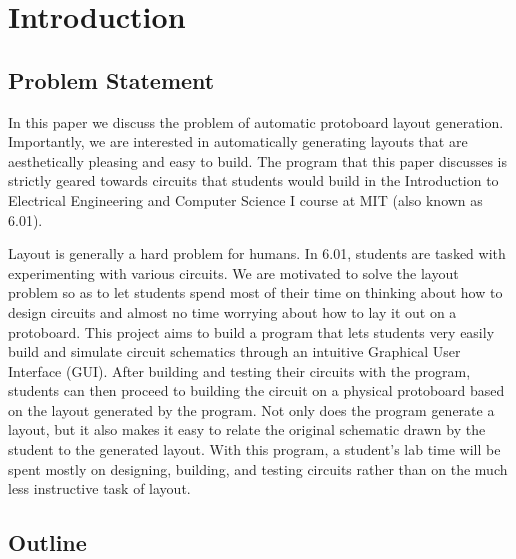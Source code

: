 

\chapter{Introduction}
\label{ch:intro}

\section{Problem Statement}

In this paper we discuss the problem of automatic protoboard layout generation.
Importantly, we are interested in automatically generating layouts that are
aesthetically pleasing and easy to build. The program that this paper discusses
is strictly geared towards circuits that students would build in the
Introduction to Electrical Engineering and Computer Science I course at MIT (also known as 6.01).

Layout is generally a hard problem for humans. In 6.01, students are tasked with
experimenting with various circuits. We are motivated to solve the layout
problem so as to let students spend most of their time on thinking about how to
design
circuits and almost no time worrying about how to lay it out on a protoboard.
This project aims to build a program that lets students very easily build and
simulate circuit schematics through an intuitive Graphical User Interface (GUI).
After building and testing their circuits with the program, students can then
proceed to building the circuit on a physical protoboard based on the layout
generated by the program. Not only does the program generate a layout, but it
also makes it easy to relate the original schematic drawn by the student to the
generated layout. With this program, a student's lab time will be spent mostly
on designing, building, and testing circuits rather than on the much less
instructive task of layout.

\section{Outline}


